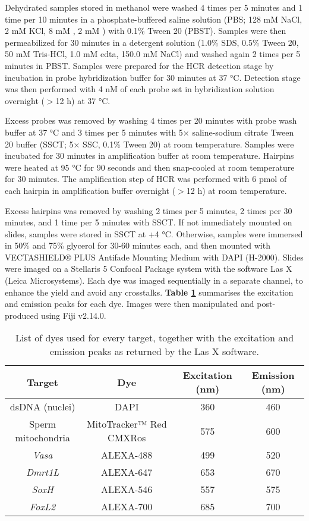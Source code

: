 \documentclass[../main.tex]{subfiles}
\begin{document}
Dehydrated samples stored in methanol were washed 4 times per 5 minutes and 1 time per 10 minutes in a phosphate-buffered saline solution (PBS; 128 mM NaCl, 2 mM KCl, 8 mM , 2 mM ) with 0.1\% Tween 20 (PBST). Samples were then permeabilized for 30 minutes in a detergent solution (1.0\% SDS, 0.5\% Tween 20, 50 mM Tris-HCl, 1.0 mM \gls{edta}, 150.0 mM NaCl) and washed again 2 times per 5 minutes in PBST. Samples were prepared for the HCR detection stage by incubation in probe hybridization buffer for 30 minutes at 37 °C. Detection stage was then performed with 4 nM of each probe set in hybridization solution overnight ($>$12 h) at 37 °C.

Excess probes was removed by washing 4 times per 20 minutes with probe wash buffer at 37 °C and 3 times per 5 minutes with 5× saline-sodium citrate Tween 20 buffer (SSCT; 5× SSC, 0.1\% Tween 20) at room temperature. Samples were incubated for 30 minutes in amplification buffer at room temperature. Hairpins were heated at 95 °C for 90 seconds and then snap-cooled at room temperature for 30 minutes. The amplification step of HCR was performed with 6 pmol of each hairpin in amplification buffer overnight ($>$12 h) at room temperature.

Excess hairpins was removed by washing 2 times per 5 minutes, 2 times per 30 minutes, and 1 time per 5 minutes with SSCT. If not immediately mounted on slides, samples were stored in SSCT at +4 °C. Otherwise, samples were immersed in 50\% and 75\% glycerol for 30-60 minutes each, and then mounted with VECTASHIELD® PLUS Antifade Mounting Medium with DAPI (H-2000). Slides were imaged on a Stellaris 5 Confocal Package system with the software Las X (Leica Microsystems). Each dye was imaged sequentially in a separate channel, to enhance the yield and avoid any crosstalks. \textbf{Table \ref{tab:imaging}} summarises the excitation and emission peaks for each dye. Images were then manipulated and post-produced using Fiji v2.14.0.

\begin{table}
    \centering
    \begin{tabular}{c c c c}
         \hline
         \textbf{Target} & \textbf{Dye} & \textbf{Excitation (nm)} & \textbf{Emission (nm)} \\
         \hline
         dsDNA (nuclei) & DAPI & 360 & 460 \\
         Sperm mitochondria & MitoTracker™ Red CMXRos & 575 & 600 \\
         \textit{Vasa} & ALEXA-488 & 499 & 520 \\
         \textit{Dmrt1L} & ALEXA-647 & 653 & 670 \\
         \textit{SoxH} & ALEXA-546 & 557 & 575 \\
         \textit{FoxL2} & ALEXA-700 & 685 & 700 \\
         \hline
    \end{tabular}
    \caption{List of dyes used for every target, together with the excitation and emission peaks as returned by the Las X software.}
    \label{tab:imaging}
\end{table}
\end{document}
